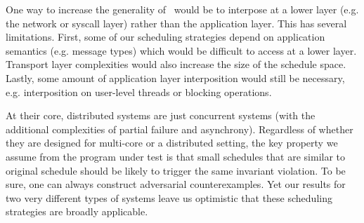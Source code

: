 One way to increase the generality of \sys~would be to interpose at a lower layer (e.g.
the network or syscall layer) rather than the application layer. This has
several limitations. First, some of our scheduling strategies depend on application
semantics (e.g. message types) which would be difficult to access at a lower
layer. Transport layer complexities would also increase the size of the schedule
space. Lastly, some amount of application layer interposition would still be
necessary, e.g. interposition on user-level threads or blocking operations.

 At their core, distributed
systems are just concurrent systems (with the additional complexities of partial
failure and asynchrony). Regardless of whether they are designed for
multi-core or a distributed setting, the key property we assume from the
program under test is that small schedules that are similar to
original schedule should be likely to trigger the same invariant
violation. To be sure, one can always construct adversarial counterexamples.
Yet our results for two very different types of systems leave us
optimistic that these scheduling strategies are broadly applicable.

